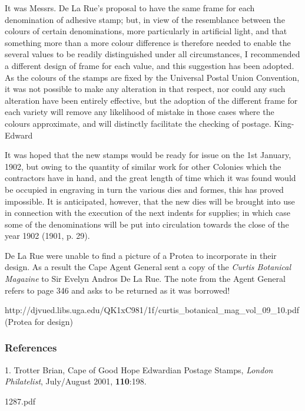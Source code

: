 It was Messrs. De La Rue's proposal to have the same frame for each denomination of adhesive stamp; but, in view of the resemblance between the colours of certain denominations, more particularly in artificial light, and that something more than a more colour difference is therefore needed to enable the several values to be readily distinguished under all circumstances, I recommended a different design of frame for each value, and this suggestion has been adopted. As the colours of the stamps are fixed by the Universal Postal Union Convention, it was not possible to make any alteration in that respect, nor could any such alteration have been entirely effective, but the adoption of the different frame for each variety will remove any likelihood of mistake in those cases where the colours approximate, and will distinctly facilitate the checking
of postage.
King-Edward

It was hoped that the new stamps would be ready for issue on the 1st January, 1902, but owing to the quantity of similar work for other Colonies which the contractors have in hand, and the great length of time which it was found would
be occupied in engraving in turn the various dies and formes, this has proved impossible. It is anticipated, however, that the new dies will be brought into use in connection with the execution of the next indents for supplies; in which case some of the denominations will be put into circulation towards the close of the year 1902 (1901, p. 29).



De La Rue were unable to find a picture of a Protea to incorporate in their design. As a result the Cape Agent General sent a copy of the \textit{Curtis Botanical Magazine} to Sir Evelyn Andros De La Rue. The note from the Agent General refers to page 346 and asks to be returned as it was borrowed!



http://djvued.libs.uga.edu/QK1xC981/1f/curtis_botanical_mag_vol_09_10.pdf (Protea for design)

\subsubsection{References}
1. Trotter Brian, Cape of Good Hope Edwardian Postage Stamps, \textit{London Philatelist}, July/August 2001, \textbf{110}:198.

1287.pdf


                                                           